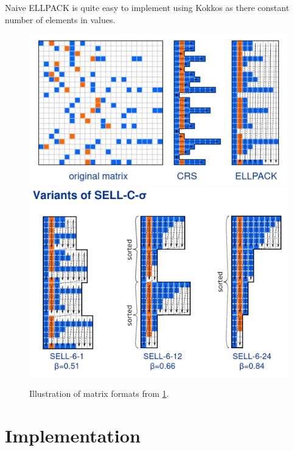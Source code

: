 \documentclass{article}
\begin{document}
Naive ELLPACK is quite easy to implement using Kokkos as there constant number of elements in values. 

 \begin{figure}[h]
	\centering
	\includegraphics[scale=0.3]{formats.png}  \\
	\includegraphics[scale=0.23]{sellc.png}  
	\caption{ Illustration of matrix formats from \ref{formats}.  }
	\label{formats}
\end{figure}





\section{Implementation}
\end{document}
